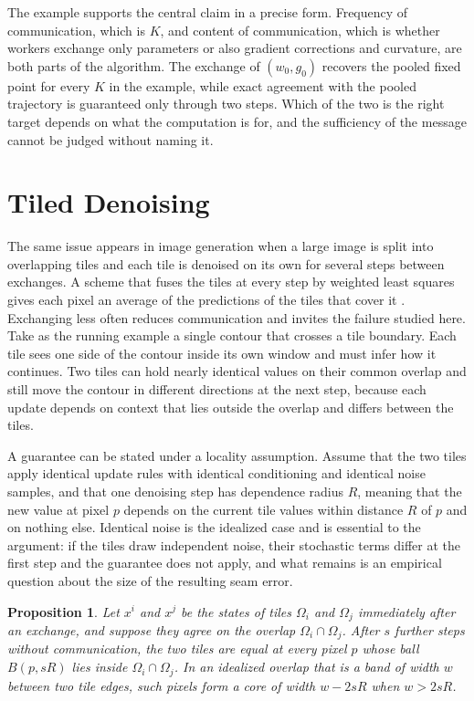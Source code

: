 \documentclass[11pt]{article}
\theoremstyle{definition}
\theoremstyle{plain}
\newtheorem{proposition}{Proposition}
\theoremstyle{remark}
\begin{document}
The example supports the central claim in a precise form. Frequency of communication, which is $K$, and content of communication, which is whether workers exchange only parameters or also gradient corrections and curvature, are both parts of the algorithm. The exchange of $(w_0,g_0)$ recovers the pooled fixed point for every $K$ in the example, while exact agreement with the pooled trajectory is guaranteed only through two steps. Which of the two is the right target depends on what the computation is for, and the sufficiency of the message cannot be judged without naming it.

\section{Tiled Denoising}\label{sec:tiles}

The same issue appears in image generation when a large image is split into overlapping tiles and each tile is denoised on its own for several steps between exchanges. A scheme that fuses the tiles at every step by weighted least squares gives each pixel an average of the predictions of the tiles that cover it \cite{bartal2023}. Exchanging less often reduces communication and invites the failure studied here. Take as the running example a single contour that crosses a tile boundary. Each tile sees one side of the contour inside its own window and must infer how it continues. Two tiles can hold nearly identical values on their common overlap and still move the contour in different directions at the next step, because each update depends on context that lies outside the overlap and differs between the tiles.

A guarantee can be stated under a locality assumption. Assume that the two tiles apply identical update rules with identical conditioning and identical noise samples, and that one denoising step has dependence radius $R$, meaning that the new value at pixel $p$ depends on the current tile values within distance $R$ of $p$ and on nothing else. Identical noise is the idealized case and is essential to the argument: if the tiles draw independent noise, their stochastic terms differ at the first step and the guarantee does not apply, and what remains is an empirical question about the size of the resulting seam error.

\begin{proposition}
Let $x^i$ and $x^j$ be the states of tiles $\Omega_i$ and $\Omega_j$ immediately after an exchange, and suppose they agree on the overlap $\Omega_i\cap\Omega_j$. After $s$ further steps without communication, the two tiles are equal at every pixel $p$ whose ball $B(p,sR)$ lies inside $\Omega_i\cap\Omega_j$. In an idealized overlap that is a band of width $w$ between two tile edges, such pixels form a core of width $w-2sR$ when $w>2sR$.
\end{proposition}
\end{document}
